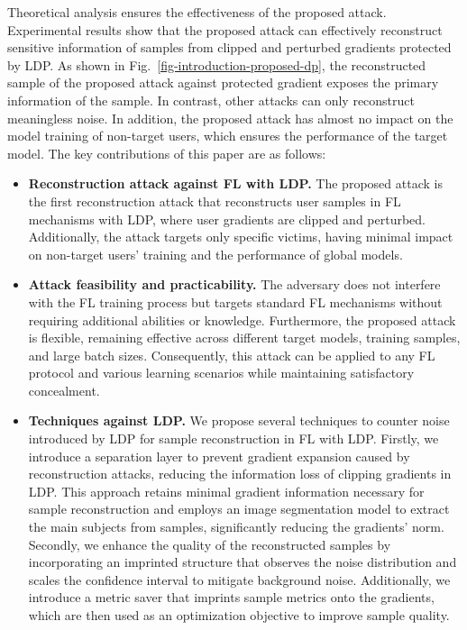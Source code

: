 \documentclass[lettersize,journal]{IEEEtran}
\begin{document}
Theoretical analysis ensures the effectiveness of the proposed attack. Experimental results show that the proposed attack can effectively reconstruct sensitive information of samples from clipped and perturbed gradients protected by LDP. As shown in Fig.~\ref{fig-introduction-proposed-dp}, the reconstructed sample of the proposed attack against protected gradient exposes the primary information of the sample. In contrast, other attacks can only reconstruct meaningless noise. In addition, the proposed attack has almost no impact on the model training of non-target users, which ensures the performance of the target model. The key contributions of this paper are as follows:

\begin{itemize}
\item \textbf{Reconstruction attack against FL with LDP.} The proposed attack is the first reconstruction attack that reconstructs user samples in FL mechanisms with LDP, where user gradients are clipped and perturbed. Additionally, the attack targets only specific victims, having minimal impact on non-target users' training and the performance of global models.

\item \textbf{Attack feasibility and practicability.} The adversary does not interfere with the FL training process but targets standard FL mechanisms without requiring additional abilities or knowledge. Furthermore, the proposed attack is flexible, remaining effective across different target models, training samples, and large batch sizes. Consequently, this attack can be applied to any FL protocol and various learning scenarios while maintaining satisfactory concealment.

\item \textbf{Techniques against LDP.} We propose several techniques to counter noise introduced by LDP for sample reconstruction in FL with LDP. Firstly, we introduce a separation layer to prevent gradient expansion caused by reconstruction attacks, reducing the information loss of clipping gradients in LDP. This approach retains minimal gradient information necessary for sample reconstruction and employs an image segmentation model to extract the main subjects from samples, significantly reducing the gradients' norm. Secondly, we enhance the quality of the reconstructed samples by incorporating an imprinted structure that observes the noise distribution and scales the confidence interval to mitigate background noise. Additionally, we introduce a metric saver that imprints sample metrics onto the gradients, which are then used as an optimization objective to improve sample quality.


\end{itemize}
\end{document}
